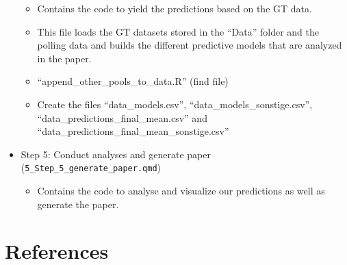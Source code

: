\documentclass[
  letterpaper,
  DIV=11,
  numbers=noendperiod]{scrartcl}
\providecommand{\tightlist}{%
  \setlength{\itemsep}{0pt}\setlength{\parskip}{0pt}}\usepackage{longtable,booktabs,array}
\begin{document}
\begin{itemize}
  \begin{itemize}
  \tightlist
  \item
    Contains the code to yield the predictions based on the GT data.
  \item
    This file loads the GT datasets stored in the ``Data'' folder and
    the polling data and builds the different predictive models that are
    analyzed in the paper.
  \item
    ``append\_other\_pools\_to\_data.R'' (find file)
  \item
    Create the files ``data\_models.csv'',
    ``data\_models\_sonstige.csv'',
    ``data\_predictions\_final\_mean.csv'' and
    ``data\_predictions\_final\_mean\_sonstige.csv''
  \end{itemize}
\item
  Step 5: Conduct analyses and generate paper
  (\texttt{5\_Step\_5\_generate\_paper.qmd})

  \begin{itemize}
  \tightlist
  \item
    Contains the code to analyse and visualize our predictions as well
    as generate the paper.
  \end{itemize}
\end{itemize}

\hypertarget{references}{%
\section*{References}\label{references}}
\end{document}
